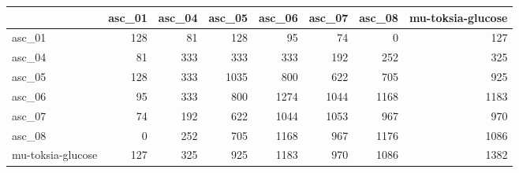 \begin{tabular}{lrrrrrrr}
\toprule
 & asc_01 & asc_04 & asc_05 & asc_06 & asc_07 & asc_08 & mu-toksia-glucose \\
\midrule
asc_01 & 128 & 81 & 128 & 95 & 74 & 0 & 127 \\
asc_04 & 81 & 333 & 333 & 333 & 192 & 252 & 325 \\
asc_05 & 128 & 333 & 1035 & 800 & 622 & 705 & 925 \\
asc_06 & 95 & 333 & 800 & 1274 & 1044 & 1168 & 1183 \\
asc_07 & 74 & 192 & 622 & 1044 & 1053 & 967 & 970 \\
asc_08 & 0 & 252 & 705 & 1168 & 967 & 1176 & 1086 \\
mu-toksia-glucose & 127 & 325 & 925 & 1183 & 970 & 1086 & 1382 \\
\bottomrule
\end{tabular}
